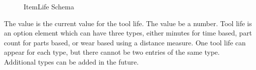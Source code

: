 \documentclass{mtconnect}	%
\begin{document}
\begin{figure}[ht]
  \centering
  \caption{ItemLife Schema}
  \label{fig:itemlife-schema}
\end{figure}

\FloatBarrier

The value is the current value for the tool life.  The value \MUST be a number. Tool life is an option element which can have three types, either minutes for time based, part count for parts based, or wear based using a distance measure.  One tool life can appear for each type, but there cannot be two entries of the same type.  Additional types can be added in the future.
\end{document}
